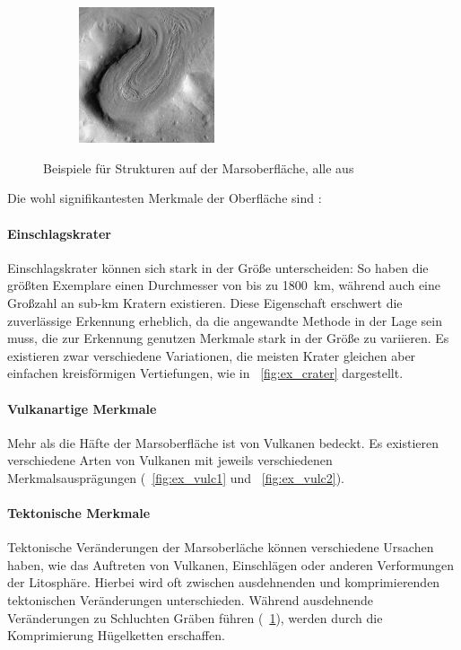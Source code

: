 \begin{figure}[h]
\begin{subfigure}[t]{0.35\textwidth}
		\captionsetup{format=plain}
		\label{fig:ex_graben}
	\end{subfigure}
	\hspace{1cm}
	\begin{subfigure}[t]{0.3\textwidth}
		\centering
		\includegraphics[height=4cm,keepaspectratio]{images/Gre13_05.jpg}
		\captionsetup{format=plain}
		\label{fig:ex_glacier}
	\end{subfigure}
	\hfill
	\caption{Beispiele für Strukturen auf der Marsoberfläche, alle aus \cite[Kap.~7]{greeley_13}}
\end{figure}

Die wohl signifikantesten Merkmale der Oberfläche sind \ua: \cite[Kap.~7]{greeley_13}
\paragraph{Einschlagskrater}
Einschlagskrater können sich stark in der Größe unterscheiden: So haben die größten Exemplare einen Durchmesser von bis zu \SI{1800}{\kilo\meter}, während auch eine Großzahl an sub-\si{\kilo\meter} Kratern existieren. Diese Eigenschaft erschwert die zuverlässige Erkennung erheblich, da die angewandte Methode in der Lage sein muss, die zur Erkennung genutzen Merkmale stark in der Größe zu variieren. Es existieren zwar verschiedene Variationen, die meisten Krater gleichen aber einfachen kreisförmigen Vertiefungen, wie in \figurename~\ref{fig:ex_crater} dargestellt.
\paragraph{Vulkanartige Merkmale}
Mehr als die Häfte der Marsoberfläche ist von Vulkanen bedeckt. Es existieren verschiedene Arten von Vulkanen mit jeweils verschiedenen Merkmalsausprägungen (\vgl \figurename~\ref{fig:ex_vulc1} und \figurename~\ref{fig:ex_vulc2}). \cite[Kap.~7]{greeley_13} 
\paragraph{Tektonische Merkmale}
Tektonische Veränderungen der Marsoberläche können verschiedene Ursachen haben, wie \zB das Auftreten von Vulkanen, Einschlägen oder anderen Verformungen der Litosphäre. \cite[Kap.~7]{greeley_13} Hierbei wird oft zwischen ausdehnenden und komprimierenden tektonischen Veränderungen unterschieden. Während ausdehnende Veränderungen zu Schluchten \bzw Gräben führen (\vgl \figurename~\ref{fig:ex_graben}), werden durch die Komprimierung Hügelketten erschaffen.
